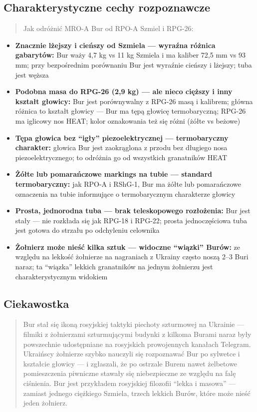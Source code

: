 \documentclass[12pt,oneside]{book}
\providecommand{\tightlist}{%
  \setlength{\itemsep}{0pt}\setlength{\parskip}{0pt}}
\begin{document}
\subsection{Charakterystyczne cechy
rozpoznawcze}\label{charakterystyczne-cechy-rozpoznawcze-93}

\begin{quote}
Jak odróżnić MRO-A Bur od RPO-A Szmiel i RPG-26:
\end{quote}

\begin{itemize}
\tightlist
\item
  \textbf{Znacznie lżejszy i cieńszy od Szmiela --- wyraźna różnica
  gabarytów:} Bur waży 4,7 kg vs 11 kg Szmiela i ma kaliber 72,5 mm vs
  93 mm; przy bezpośrednim porównaniu Bur jest wyraźnie cieńszy i
  lżejszy; tuba jest węższa
\item
  \textbf{Podobna masa do RPG-26 (2,9 kg) --- ale nieco cięższy i inny
  kształt głowicy:} Bur jest porównywalny z RPG-26 masą i kalibrem;
  główna różnica to kształt głowicy --- Bur ma tępą głowicę
  termobaryczną; RPG-26 ma iglicowy nos HEAT; kolor oznakowania też się
  różni (żółte vs beżowe)
\item
  \textbf{Tępa głowica bez ``igły'' piezoelektrycznej --- termobaryczny
  charakter:} głowica Bur jest zaokrąglona z przodu bez długiego nosa
  piezoelektrycznego; to odróżnia go od wszystkich granatników HEAT
\item
  \textbf{Żółte lub pomarańczowe markings na tubie --- standard
  termobaryczny:} jak RPO-A i RShG-1, Bur ma żółte lub pomarańczowe
  oznaczenia na tubie informujące o termobarycznym charakterze głowicy
\item
  \textbf{Prosta, jednorodna tuba --- brak teleskopowego rozłożenia:}
  Bur jest stały --- nie rozkłada się jak RPG-18 i RPG-22; prosta
  jednoczęściowa tuba jest gotowa do strzału po odchyleniu celownika
\item
  \textbf{Żołnierz może nieść kilka sztuk --- widoczne ``wiązki''
  Burów:} ze względu na lekkość żołnierze na nagraniach z Ukrainy często
  noszą 2--3 Buri naraz; ta ``wiązka'' lekkich granatników na jednym
  żołnierzu jest charakterystycznym widokiem
\end{itemize}

\subsection{Ciekawostka}\label{ciekawostka-93}

\begin{quote}
Bur stał się ikoną rosyjskiej taktyki piechoty szturmowej na Ukrainie
--- filmiki z żołnierzami szturmującymi budynki z kilkoma Burami naraz
były powszechnie udostępniane na rosyjskich prowojennych kanałach
Telegram. Ukraińscy żołnierze szybko nauczyli się rozpoznawać Bur po
sylwetce i kształcie głowicy --- i zgłaszali, że po ostrzale Burem nawet
żelbetowe pomieszczenia piwniczne stawały się niebezpieczne ze względu
na falę ciśnienia. Bur jest przykładem rosyjskiej filozofii ``lekka i
masowa'' --- zamiast jednego ciężkiego Szmiela, trzech lekkich Burów,
które może nieść jeden żołnierz.
\end{quote}
\end{document}
